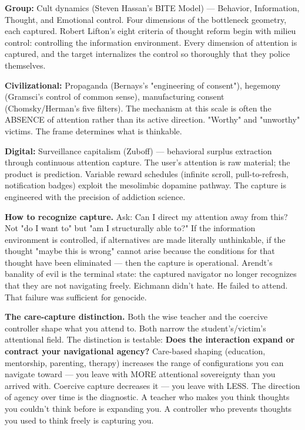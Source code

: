 \textbf{Group:} Cult dynamics (Steven Hassan's BITE Model) — Behavior, Information, Thought, and Emotional control. Four dimensions of the bottleneck geometry, each captured. Robert Lifton's eight criteria of thought reform begin with milieu control: controlling the information environment. Every dimension of attention is captured, and the target internalizes the control so thoroughly that they police themselves.


\textbf{Civilizational:} Propaganda (Bernays's "engineering of consent"), hegemony (Gramsci's control of common sense), manufacturing consent (Chomsky/\allowbreak Herman's five filters). The mechanism at this scale is often the ABSENCE of attention rather than its active direction. "Worthy" and "unworthy" victims. The frame determines what is thinkable.


\textbf{Digital:} Surveillance capitalism (Zuboff) — behavioral surplus extraction through continuous attention capture. The user's attention is raw material; the product is prediction. Variable reward schedules (infinite scroll, pull-to-refresh, notification badges) exploit the mesolimbic dopamine pathway. The capture is engineered with the precision of addiction science.


\textbf{How to recognize capture.} Ask: Can I direct my attention away from this? Not "do I want to" but "am I structurally able to?" If the information environment is controlled, if alternatives are made literally unthinkable, if the thought "maybe this is wrong" cannot arise because the conditions for that thought have been eliminated — then the capture is operational. Arendt's banality of evil is the terminal state: the captured navigator no longer recognizes that they are not navigating freely. Eichmann didn't hate. He failed to attend. That failure was sufficient for genocide.


\textbf{The care-capture distinction.} Both the wise teacher and the coercive controller shape what you attend to. Both narrow the student's/\allowbreak victim's attentional field. The distinction is testable: \textbf{Does the interaction expand or contract your navigational agency?} Care-based shaping (education, mentorship, parenting, therapy) increases the range of configurations you can navigate toward — you leave with MORE attentional sovereignty than you arrived with. Coercive capture decreases it — you leave with LESS. The direction of agency over time is the diagnostic. A teacher who makes you think thoughts you couldn't think before is expanding you. A controller who prevents thoughts you used to think freely is capturing you.


